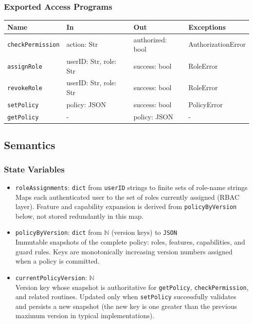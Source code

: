 \documentclass[12pt, titlepage]{article}
\begin{document}
\subsubsection{Exported Access Programs}

\begin{center}
\begin{tabular}{p{4cm} p{4cm} p{4cm} p{4cm}}
\hline
\textbf{Name} & \textbf{In} & \textbf{Out} & \textbf{Exceptions} \\
\hline
\texttt{checkPermission} & action: Str & authorized: bool & AuthorizationError \\
\texttt{assignRole} & userID: Str, role: Str & success: bool & RoleError \\
\texttt{revokeRole} & userID: Str, role: Str & success: bool & RoleError \\
\texttt{setPolicy} & policy: JSON & success: bool & PolicyError \\
\texttt{getPolicy} & - & policy: JSON & - \\
\hline
\end{tabular}
\end{center}

\subsection{Semantics}

\subsubsection{State Variables}

\begin{itemize}
    \item \texttt{roleAssignments}: \texttt{dict} from \texttt{userID} strings to finite sets of role-name strings\\
    Maps each authenticated user to the set of roles currently assigned (RBAC layer). Feature and capability expansion is derived from \texttt{policyByVersion} below, not stored redundantly in this map.
    \item \texttt{policyByVersion}: \texttt{dict} from $\mathbb{N}$ (version keys) to \texttt{JSON}\\
    Immutable snapshots of the complete policy: roles, features, capabilities, and guard rules. Keys are monotonically increasing version numbers assigned when a policy is committed.
    \item \texttt{currentPolicyVersion}: $\mathbb{N}$\\
    Version key whose snapshot is authoritative for \texttt{getPolicy}, \texttt{checkPermission}, and related routines. Updated only when \texttt{setPolicy} successfully validates and persists a new snapshot (the new key is one greater than the previous maximum version in typical implementations).
\end{itemize}
\end{document}
